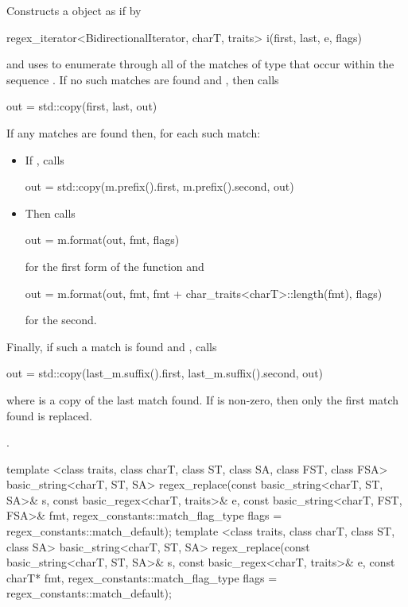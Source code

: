 \begin{itemdescr}
\pnum
{}%
%
\effects
Constructs a  object 
as if by
\begin{codeblock}
regex_iterator<BidirectionalIterator, charT, traits> i(first, last, e, flags)
\end{codeblock}
and uses  to enumerate through all
of the matches  of type  
that occur within the sequence .
If no such
matches are found and
, then calls
\begin{codeblock}
out = std::copy(first, last, out)
\end{codeblock}
If any matches are found then, for each such match:
\begin{itemize}
\item
If , calls 
\begin{codeblock}
out = std::copy(m.prefix().first, m.prefix().second, out)
\end{codeblock}
\item
Then calls
\begin{codeblock}
out = m.format(out, fmt, flags)
\end{codeblock}
for the first form of the function and
\begin{codeblock}
out = m.format(out, fmt, fmt + char_traits<charT>::length(fmt), flags)
\end{codeblock}
for the second.
\end{itemize}
Finally, if such a match
is found and ,
calls
\begin{codeblock}
out = std::copy(last_m.suffix().first, last_m.suffix().second, out)
\end{codeblock}
where  is a copy of the last match
found. If  
is non-zero, then only the first match found is replaced.

\pnum\returns {}.
\end{itemdescr}

%
\begin{itemdecl}
template <class traits, class charT, class ST, class SA, class FST, class FSA>
  basic_string<charT, ST, SA>
  regex_replace(const basic_string<charT, ST, SA>& s,
                const basic_regex<charT, traits>& e,
                const basic_string<charT, FST, FSA>& fmt,
                regex_constants::match_flag_type flags =
                  regex_constants::match_default); 
template <class traits, class charT, class ST, class SA>
  basic_string<charT, ST, SA>
  regex_replace(const basic_string<charT, ST, SA>& s,
                const basic_regex<charT, traits>& e,
                const charT* fmt,
                regex_constants::match_flag_type flags =
                  regex_constants::match_default);
\end{itemdecl}

